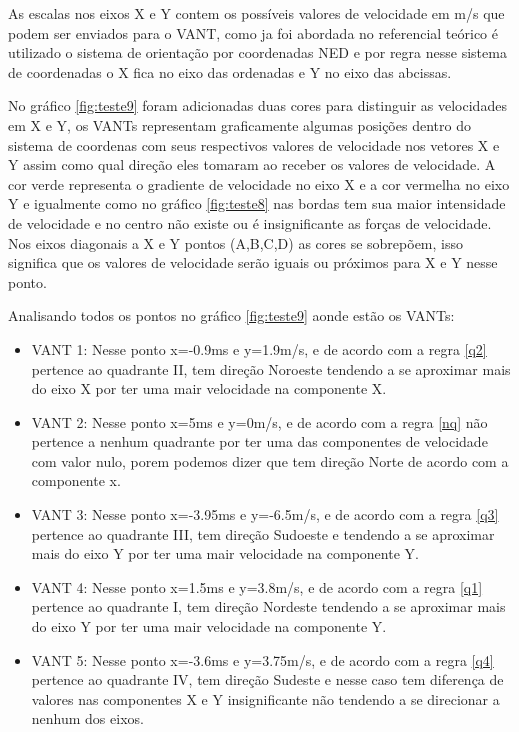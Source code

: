 As escalas nos eixos X e Y contem os possíveis valores de velocidade em m/s que podem ser enviados para o VANT, como ja foi abordada no referencial teórico é utilizado o sistema de orientação por coordenadas NED e por regra nesse sistema de coordenadas o X fica no eixo das ordenadas e Y no eixo das abcissas.

No gráfico \ref{fig:teste9} foram adicionadas duas cores para distinguir as velocidades em X e Y, os VANTs representam graficamente algumas posições dentro do sistema de coordenas com seus respectivos valores de velocidade nos vetores X e Y assim como qual direção eles tomaram ao receber os valores de velocidade. A cor verde representa o gradiente de velocidade no eixo X e a cor vermelha no eixo Y e igualmente como no gráfico \ref{fig:teste8} nas bordas tem sua maior intensidade de velocidade e no centro não existe ou é insignificante as forças de velocidade. Nos eixos diagonais a X e Y pontos (A,B,C,D) as cores se sobrepõem, isso significa que os valores de velocidade serão iguais ou próximos para X e Y nesse ponto.

Analisando todos os pontos no gráfico \ref{fig:teste9} aonde estão os VANTs:

\begin{itemize}
	\item VANT 1: Nesse ponto x=-0.9ms e y=1.9m/s, e de acordo com a regra \ref{q2} pertence ao quadrante II, tem direção Noroeste tendendo a se aproximar mais do eixo X por ter uma mair velocidade na componente X.
	\item VANT 2: Nesse ponto x=5ms e y=0m/s, e de acordo com a regra \ref{nq} não pertence a nenhum quadrante por ter uma das componentes de velocidade com valor nulo, porem podemos dizer que tem direção Norte de acordo com a componente x.
	\item VANT 3: Nesse ponto x=-3.95ms e y=-6.5m/s, e de acordo com a regra \ref{q3} pertence ao quadrante III, tem direção Sudoeste e tendendo a se aproximar mais do eixo Y por ter uma mair velocidade na componente Y.
	\item VANT 4: Nesse ponto x=1.5ms e y=3.8m/s, e de acordo com a regra \ref{q1} pertence ao quadrante I, tem direção Nordeste tendendo a se aproximar mais do eixo Y por ter uma mair velocidade na componente Y.
	\item VANT 5: Nesse ponto x=-3.6ms e y=3.75m/s, e de acordo com a regra \ref{q4} pertence ao quadrante IV, tem direção Sudeste e nesse caso tem diferença de valores nas componentes X e Y insignificante não tendendo a se direcionar a nenhum dos eixos.
\end{itemize}
 

